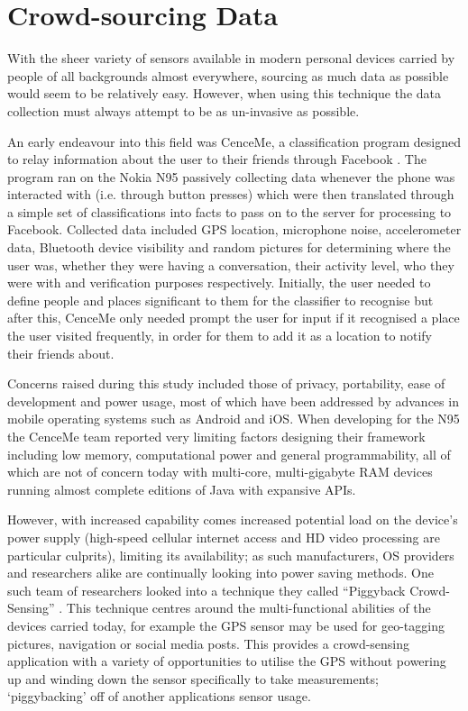 \documentclass{UoYCSproject}
\begin{document}
        \section{Crowd-sourcing Data}
        \label{sec:crowd}
        
            With the sheer variety of sensors available in modern personal devices carried by people of all backgrounds almost everywhere, sourcing as much data as possible would seem to be relatively easy. However, when using this technique the data collection must always attempt to be as un-invasive as possible. 
            
            An early endeavour into this field was CenceMe, a classification program designed to relay information about the user to their friends through Facebook \citep{miluzzo2008sensing}. The program ran on the Nokia N95 passively collecting data whenever the phone was interacted with (i.e. through button presses) which were then translated through a simple set of classifications into facts to pass on to the server for processing to Facebook. Collected data included GPS location, microphone noise, accelerometer data, Bluetooth device visibility and random pictures for determining where the user was, whether they were having a conversation, their activity level, who they were with and verification purposes respectively. Initially, the user needed to define people and places significant to them for the classifier to recognise but after this, CenceMe only needed prompt the user for input if it recognised a place the user visited frequently, in order for them to add it as a location to notify their friends about.
            
            Concerns raised during this study included those of privacy, portability, ease of development and power usage, most of which have been addressed by advances in mobile operating systems such as Android and iOS. When developing for the N95 the CenceMe team reported very limiting factors designing their framework including low memory, computational power and general programmability, all of which are not of concern today with multi-core, multi-gigabyte RAM devices running almost complete editions of Java with expansive APIs.
            
            However, with increased capability comes increased potential load on the device's power supply (high-speed cellular internet access and HD video processing are particular culprits), limiting its availability; as such manufacturers, OS providers and researchers alike are continually looking into power saving methods. One such team of researchers looked into a technique they called ``Piggyback Crowd-Sensing'' \citep{lane2013piggyback}. This technique centres around the multi-functional abilities of the devices carried today, for example the GPS sensor may be used for geo-tagging pictures, navigation or social media posts. This provides a crowd-sensing application with a variety of opportunities to utilise the GPS without powering up and winding down the sensor specifically to take measurements; `piggybacking' off of another applications sensor usage. 
            
\end{document}
